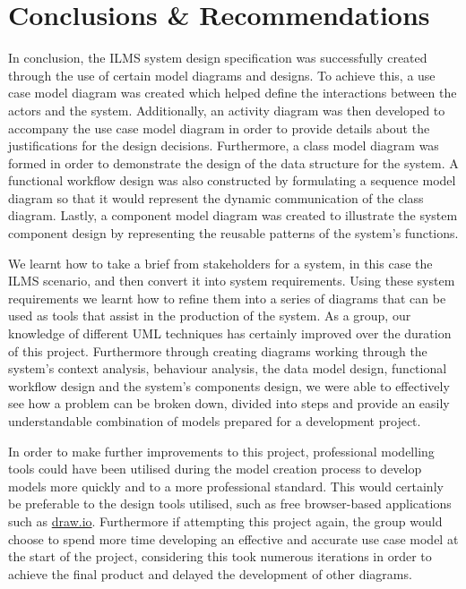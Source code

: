 \chapter{Conclusions \& Recommendations}

In conclusion, the ILMS system design specification was successfully created through the use of certain model diagrams and designs. To achieve this, a use case model diagram was created which helped define the interactions between the actors and the system. Additionally, an activity diagram was then developed to accompany the use case model diagram in order to provide details about the justifications for the design decisions. Furthermore, a class model diagram was formed in order to demonstrate the design of the data structure for the system. A functional workflow design was also constructed by formulating a sequence model diagram so that it would represent the dynamic communication of the class diagram. Lastly, a component model diagram was created to illustrate the system component design by representing the reusable patterns of the system’s functions.

We learnt how to take a brief from stakeholders for a system, in this case the ILMS scenario, and then convert it into system requirements. Using these system requirements we learnt how to refine them into a series of diagrams that can be used as tools that assist in the production of the system. As a group, our knowledge of different UML techniques has certainly improved over the duration of this project. Furthermore through creating diagrams working through the system’s context analysis, behaviour analysis, the data model design, functional workflow design and the system’s components design, we were able to effectively see how a problem can be broken down, divided into steps and provide an easily understandable combination of models prepared for a development project. 

In order to make further improvements to this project, professional modelling tools could have been utilised during the model creation process to develop models more quickly and to a more professional standard. This would certainly be preferable to the design tools utilised, such as free browser-based applications such as \href{https://www.draw.io}{draw.io}. Furthermore if attempting this project again, the group would choose to spend more time developing an effective and accurate use case model at the start of the project, considering this took numerous iterations in order to achieve the final product and delayed the development of other diagrams. 